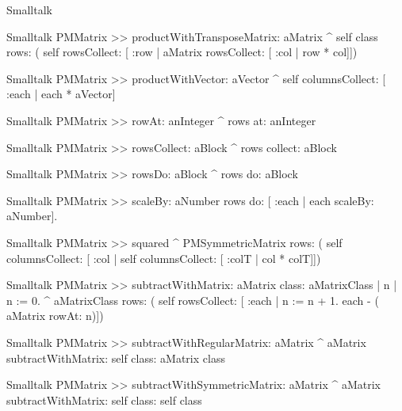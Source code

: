 \begin{displaycode}{Smalltalk}
\begin{displaycode}{Smalltalk}
PMMatrix >> productWithTransposeMatrix: aMatrix
    ^ self class rows: ( self rowsCollect: [ :row | aMatrix 
                                    rowsCollect: [ :col | row * col]])
\end{displaycode}

\begin{displaycode}{Smalltalk}
PMMatrix >> productWithVector: aVector
    ^ self columnsCollect: [ :each | each * aVector]
\end{displaycode}

\begin{displaycode}{Smalltalk}
PMMatrix >> rowAt: anInteger
    ^ rows at: anInteger
\end{displaycode}

\begin{displaycode}{Smalltalk}
PMMatrix >> rowsCollect: aBlock
    ^ rows collect: aBlock
\end{displaycode}

\begin{displaycode}{Smalltalk}
PMMatrix >> rowsDo: aBlock
    ^ rows do: aBlock
\end{displaycode}

\begin{displaycode}{Smalltalk}
PMMatrix >> scaleBy: aNumber
    rows do: [ :each | each scaleBy: aNumber].
\end{displaycode}

\begin{displaycode}{Smalltalk}
PMMatrix >> squared
    ^ PMSymmetricMatrix rows: ( self columnsCollect: [ :col | self 
                               columnsCollect: [ :colT | col * colT]])
\end{displaycode}

\begin{displaycode}{Smalltalk}
PMMatrix >> subtractWithMatrix: aMatrix class: aMatrixClass
    | n |
    n := 0.
    ^ aMatrixClass rows: ( self rowsCollect: [ :each | n := n + 1. 
                                          each - ( aMatrix rowAt: n)])
\end{displaycode}

\begin{displaycode}{Smalltalk}
PMMatrix >> subtractWithRegularMatrix: aMatrix
    ^ aMatrix subtractWithMatrix: self class: aMatrix class
\end{displaycode}

\begin{displaycode}{Smalltalk}
PMMatrix >> subtractWithSymmetricMatrix: aMatrix
    ^ aMatrix subtractWithMatrix: self class: self class
\end{displaycode}


\end{displaycode}
